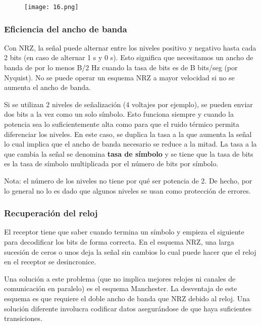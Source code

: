 \documentclass{book}
\begin{document}
	\begin{figure}[H]
		\centering
		\texttt{[image: 16.png]}
	\end{figure}
	
	\subsubsection{Eficiencia del ancho de banda}
	Con NRZ, la señal puede alternar entre los niveles positivo y negativo hasta cada 2 bits (en caso de alternar 1 s y 0 s). Esto significa que necesitamos un ancho de banda de por lo menos B/2 Hz cuando la tasa de bits es de B bits/seg (por Nyquist). No se puede operar un esquema NRZ a mayor velocidad si no se aumenta el ancho de banda.
	
	\vspace{3mm}
	Si se utilizan 2 niveles de señalización (4 voltajes por ejemplo), se pueden enviar dos bits a la vez como un solo símbolo. Esto funciona siempre y cuando la potencia sea lo suficientemente alta como para que el ruido térmico permita diferenciar los niveles. En este caso, se duplica la tasa a la que aumenta la señal lo cual implica que el ancho de banda necesario se reduce a la mitad. La tasa a la que cambia la señal se denomina \textbf{tasa de símbolo} y se tiene que la tasa de bits es la tasa de símbolo multiplicada por el número de bits por símbolo.
	
	\vspace{3mm}
	Nota: el número de los niveles no tiene por qué ser potencia de 2. De hecho, por lo general no lo es dado que algunos niveles se usan como protección de errores.
	
	\subsubsection{Recuperación del reloj}
	El receptor tiene que saber cuando termina un símbolo y empieza el siguiente para decodificar los bits de forma correcta. En el esquema NRZ, una larga sucesión de ceros o unos deja la señal sin cambios lo cual puede hacer que el reloj en el receptor se desincronice.
	
	\vspace{3mm}
	Una solución a este problema (que no implica mejores relojes ni canales de comunicación en paralelo) es el esquema Manchester. La desventaja de este esquema es que requiere el doble ancho de banda que NRZ debido al reloj. Una solución diferente involucra codificar datos asegurándose de que haya suficientes transiciones.
	
\end{document}
